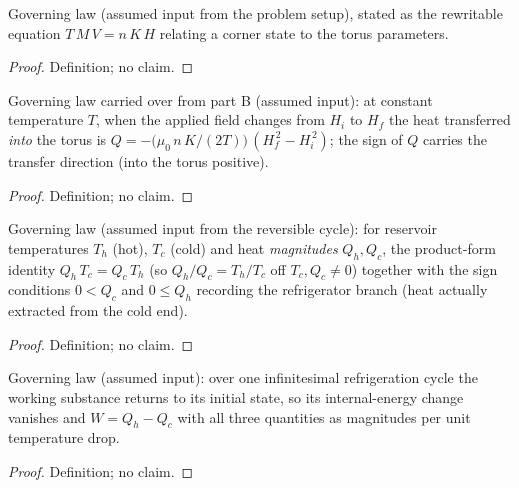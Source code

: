 \begin{definition}
\label{def:IPhO2026Problems_problem_IPhO_2026_3_C_4:ParamagnetEOS}
Governing law (assumed input from the problem setup), stated as the
rewritable equation $T\,M\,V = n\,K\,H$ relating a corner state to the
torus parameters.
\end{definition}
\begin{proof}
Definition; no claim.
\end{proof}

\begin{definition}
\label{def:IPhO2026Problems_problem_IPhO_2026_3_C_4:IsothermalHeatIntoTorus}
Governing law carried over from part B (assumed input): at constant
temperature $T$, when the applied field changes from $H_i$ to $H_f$
the heat transferred \emph{into} the torus is
$Q = -\bigl(\mu_0\,n\,K / (2T)\bigr)\,(H_f^{\,2} - H_i^{\,2})$; the
sign of $Q$ carries the transfer direction (into the torus positive).
\end{definition}
\begin{proof}
Definition; no claim.
\end{proof}

\begin{definition}
\label{def:IPhO2026Problems_problem_IPhO_2026_3_C_4:CarnotHeatRatio}
Governing law (assumed input from the reversible cycle): for reservoir
temperatures $T_h$ (hot), $T_c$ (cold) and heat \emph{magnitudes}
$Q_h, Q_c$, the product-form identity $Q_h\,T_c = Q_c\,T_h$ (so
$Q_h / Q_c = T_h / T_c$ off $T_c, Q_c \neq 0$) together with the sign
conditions $0 < Q_c$ and $0 \le Q_h$ recording the refrigerator branch
(heat actually extracted from the cold end).
\end{definition}
\begin{proof}
Definition; no claim.
\end{proof}

\begin{definition}
\label{def:IPhO2026Problems_problem_IPhO_2026_3_C_4:CycleWorkHeatBalance}
Governing law (assumed input): over one infinitesimal refrigeration
cycle the working substance returns to its initial state, so its
internal-energy change vanishes and $W = Q_h - Q_c$ with all three
quantities as magnitudes per unit temperature drop.
\end{definition}
\begin{proof}
Definition; no claim.
\end{proof}

